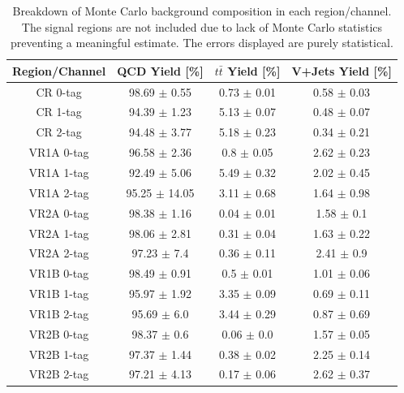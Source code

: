 \begin{table}[!htb]
\begin{center}
\begin{tabular}{|c|c|c|c|}
\hline
Region/Channel & QCD Yield [\%] & $t\bar{t}$ Yield [\%] & V+Jets Yield [\%]  \\ \hline
CR 0-tag & 98.69 $\pm$ 0.55 & 0.73 $\pm$ 0.01 & 0.58 $\pm$ 0.03 \\
\hline
CR 1-tag & 94.39 $\pm$ 1.23 & 5.13 $\pm$ 0.07 & 0.48 $\pm$ 0.07 \\
\hline
CR 2-tag & 94.48 $\pm$ 3.77 & 5.18 $\pm$ 0.23 & 0.34 $\pm$ 0.21 \\
\hline
VR1A 0-tag & 96.58 $\pm$ 2.36 & 0.8 $\pm$ 0.05 & 2.62 $\pm$ 0.23 \\
\hline
VR1A 1-tag & 92.49 $\pm$ 5.06 & 5.49 $\pm$ 0.32 & 2.02 $\pm$ 0.45 \\
\hline
VR1A 2-tag & 95.25 $\pm$ 14.05 & 3.11 $\pm$ 0.68 & 1.64 $\pm$ 0.98 \\
\hline
VR2A 0-tag & 98.38 $\pm$ 1.16 & 0.04 $\pm$ 0.01 & 1.58 $\pm$ 0.1 \\
\hline
VR2A 1-tag & 98.06 $\pm$ 2.81 & 0.31 $\pm$ 0.04 & 1.63 $\pm$ 0.22 \\
\hline
VR2A 2-tag & 97.23 $\pm$ 7.4 & 0.36 $\pm$ 0.11 & 2.41 $\pm$ 0.9 \\
\hline
VR1B 0-tag & 98.49 $\pm$ 0.91 & 0.5 $\pm$ 0.01 & 1.01 $\pm$ 0.06 \\
\hline
VR1B 1-tag & 95.97 $\pm$ 1.92 & 3.35 $\pm$ 0.09 & 0.69 $\pm$ 0.11 \\
\hline
VR1B 2-tag & 95.69 $\pm$ 6.0 & 3.44 $\pm$ 0.29 & 0.87 $\pm$ 0.69 \\
\hline
VR2B 0-tag & 98.37 $\pm$ 0.6 & 0.06 $\pm$ 0.0 & 1.57 $\pm$ 0.05 \\
\hline
VR2B 1-tag & 97.37 $\pm$ 1.44 & 0.38 $\pm$ 0.02 & 2.25 $\pm$ 0.14 \\
\hline
VR2B 2-tag & 97.21 $\pm$ 4.13 & 0.17 $\pm$ 0.06 & 2.62 $\pm$ 0.37 \\
\hline
\end{tabular}
\caption{Breakdown of Monte Carlo background composition in each region/channel.
         The signal regions are not included due to lack of Monte Carlo statistics preventing a meaningful estimate.
         The errors displayed are purely statistical.
     }
\label{tab:bkg_comp}
\end{center}
\end{table}

